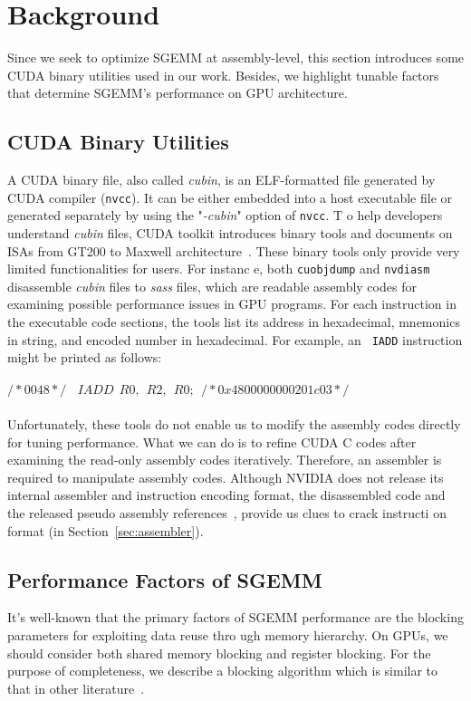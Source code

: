\section{Background}
\label{sec:background}
Since we seek to optimize SGEMM at assembly-level, this section introduces some CUDA binary utilities used in our work. 
Besides, we highlight tunable factors that determine SGEMM's performance on GPU architecture.

\subsection{CUDA Binary Utilities}
\label{sec:cuda}

A CUDA binary file, also called {\em cubin}, is an ELF-formatted file generated by CUDA compiler ({\tt nvcc}). It can be
 either embedded into a host executable file or generated separately by using the "{\em -cubin}" option of {\tt nvcc}. T
o help developers understand {\em cubin} files, CUDA toolkit introduces binary tools and documents on ISAs from GT200 to
 Maxwell architecture~\cite{gtx980}. These binary tools only provide very limited functionalities for users. For instanc
e, both {\tt cuobjdump} and {\tt nvdiasm} disassemble {\em cubin} files to {\em sass} files, which are readable assembly
 codes for examining possible performance issues in GPU programs. For each instruction in the executable code sections, 
the tools list its address in hexadecimal, mnemonics in string, and encoded number in hexadecimal. For example, an {\tt 
IADD} instruction might be printed as follows: \\\\
$/*0048*/~~~~IADD~~R0,~~R2,~~R0;~~/* 0x4800000000201c03 */$\\\\
Unfortunately, these tools do not enable us to modify the assembly codes directly for tuning performance. What we can do
 is to refine CUDA C codes after examining the read-only assembly codes iteratively. Therefore, an assembler is required
 to manipulate assembly codes. Although NVIDIA does not release its internal assembler and instruction encoding format, 
the disassembled code and the released pseudo assembly references~\cite{ptx2015isa}, provide us clues to crack instructi
on format (in Section~\ref{sec:assembler}).


\subsection{Performance Factors of SGEMM}
\label{sec:sgemm}
It's well-known that the primary factors of SGEMM performance are the blocking parameters for exploiting data reuse thro
ugh memory hierarchy. On GPUs, we should consider both shared memory blocking and register blocking. For the purpose of 
completeness, we describe a blocking algorithm which is similar to that in other literature~\cite{magma,nervana_sgemm_wi
ki,lai,tan}.

